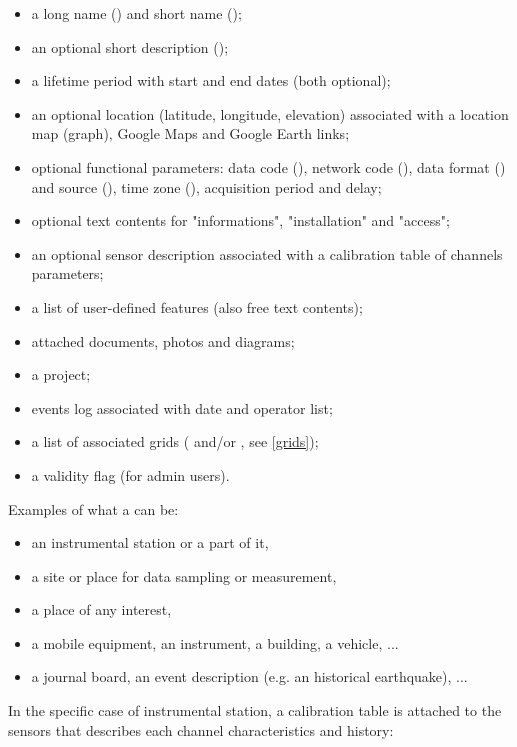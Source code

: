 \begin{itemize}
\item    a long name () and short name ();
\item    an optional short description ();
\item    a lifetime period with start and end dates (both optional);
\item    an optional location (latitude, longitude, elevation) associated with a location map (graph), Google Maps and Google Earth links;
\item	 optional functional parameters: data code (), network code (), data format () and source (), time zone (), acquisition period and delay;	 

\item    optional text contents for "informations", "installation" and "access";
\item    an optional sensor description associated with a calibration table of channels parameters;
\item    a list of user-defined features (also free text contents);
\item    attached documents, photos and diagrams;
\item    a project;
\item    events log associated with date and operator list;
\item    a list of associated grids ( and/or , see \ref{grids});
\item    a validity flag (for admin users).
\end{itemize}

Examples of what a  can be:
\begin{itemize}
\item    an instrumental station or a part of it,
\item    a site or place for data sampling or measurement,
\item    a place of any interest,
\item    a mobile equipment, an instrument, a building, a vehicle, ...
\item    a journal board, an event description (e.g. an historical earthquake), ...
\end{itemize}

In the specific case of instrumental station, a calibration table is attached to the  sensors that describes each channel characteristics and history:

